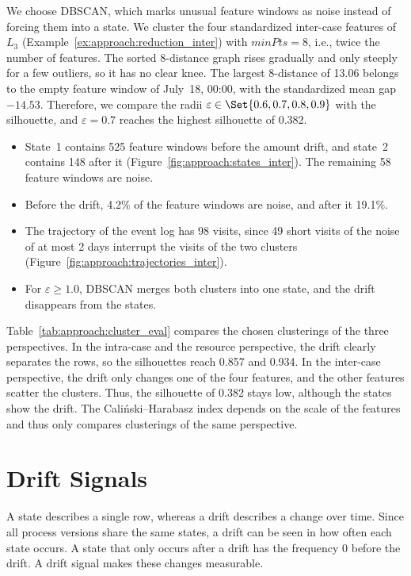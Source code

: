 \begin{example}
	\label{ex:approach:clustering_inter}
	We choose DBSCAN, which marks unusual feature windows as noise instead of forcing them into a state. We cluster the four standardized inter-case features of $L_3$ (Example~\ref{ex:approach:reduction_inter}) with $\mathit{minPts} = 8$, i.e., twice the number of features. The sorted 8-distance graph rises gradually and only steeply for a few outliers, so it has no clear knee. The largest 8-distance of 13.06 belongs to the empty feature window of July~18, 00:00, with the standardized mean gap $-14.53$. Therefore, we compare the radii $\varepsilon \in \Set{0.6, 0.7, 0.8, 0.9}$ with the silhouette, and $\varepsilon = 0.7$ reaches the highest silhouette of 0.382.
	\begin{itemize}
		\item State~1 contains 525 feature windows before the amount drift, and state~2 contains 148 after it (Figure~\ref{fig:approach:states_inter}). The remaining 58 feature windows are noise.

		\item Before the drift, 4.2\% of the feature windows are noise, and after it 19.1\%.

		\item The trajectory of the event log has 98 visits, since 49 short visits of the noise of at most 2 days interrupt the visits of the two clusters (Figure~\ref{fig:approach:trajectories_inter}).

		\item For $\varepsilon \ge 1.0$, DBSCAN merges both clusters into one state, and the drift disappears from the states.
	\end{itemize}
\end{example}

Table~\ref{tab:approach:cluster_eval} compares the chosen clusterings of the three perspectives. In the intra-case and the resource perspective, the drift clearly separates the rows, so the silhouettes reach 0.857 and 0.934. In the inter-case perspective, the drift only changes one of the four features, and the other features scatter the clusters. Thus, the silhouette of 0.382 stays low, although the states show the drift. The Cali\'nski--Harabasz index depends on the scale of the features and thus only compares clusterings of the same perspective.

\section{Drift Signals}
\label{sec:approach:drift_signals}
A state describes a single row, whereas a drift describes a change over time. Since all process versions share the same states, a drift can be seen in how often each state occurs. A state that only occurs after a drift has the frequency 0 before the drift. A drift signal makes these changes measurable.

